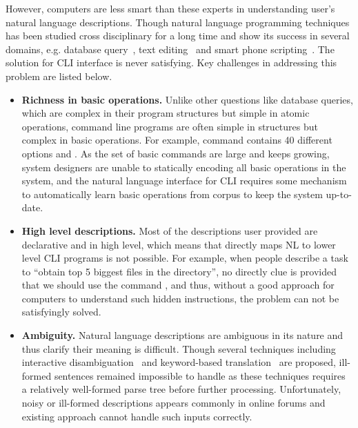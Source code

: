 However, computers are less smart than these experts in understanding user's natural language descriptions. Though natural language programming techniques has been studied cross disciplinary for a long time and show its success in several domains, e.g. database query~\cite{DBLP:journals/pvldb/LiJ14, DBLP:conf/sigmod/GulwaniM14}, text editing~\cite{DBLP:journals/corr/DesaiGHJKMRR15} and smart phone scripting~\cite{DBLP:conf/mobisys/LeGS13}. The solution for CLI interface is never satisfying. Key challenges in addressing this problem are listed below.
\begin{itemize}
\item \textbf{Richness in basic operations.} Unlike other questions like database queries, which are complex in their program structures but simple in atomic operations, command line programs are often simple in structures but complex in basic operations. For example, command  contains 40 different options and . As the set of basic commands are large and keeps growing, system designers are unable to statically encoding all basic operations in the system, and the natural language interface for CLI requires some mechanism to automatically learn basic operations from corpus to keep the system up-to-date.
\item \textbf{High level descriptions.} Most of the descriptions user provided are declarative and in high level, which means that directly maps NL to lower level CLI programs is not possible. For example, when people describe a task to ``obtain top 5 biggest files in the directory'', no directly clue is provided that we should use the command , and thus, without a good approach for computers to understand such hidden instructions, the problem can not be satisfyingly solved.
\item \textbf{Ambiguity.} Natural language descriptions are ambiguous in its nature and thus clarify their meaning is difficult. Though several techniques including interactive disambiguation~\cite{DBLP:journals/pvldb/LiJ14} and keyword-based translation~\cite{DBLP:conf/sigmod/GulwaniM14} are proposed, ill-formed sentences remained impossible to handle as these techniques requires a relatively well-formed parse tree before further processing. Unfortunately, noisy or ill-formed descriptions appears commonly in online forums and existing approach cannot handle such inputs correctly.

\end{itemize}

